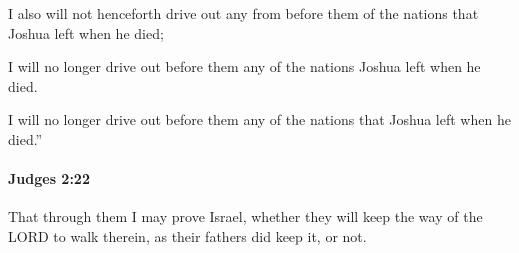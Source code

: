 			\begin{versebox}
					\item[BHS] 
					\item[ASV] I also will not henceforth drive out any from before them of the nations that Joshua left when he died;
					\item[NIV] I will no longer drive out before them any of the nations Joshua left when he died.
					\item[NRSV] I will no longer drive out before them any of the nations that Joshua left when he died.”
			\end{versebox}

		\paragraph{Judges 2:22} %
			\label{JUDGES-2-22}

			That through them I may prove Israel, whether they will keep the way of the LORD to walk therein, as their fathers did keep it, or not.

